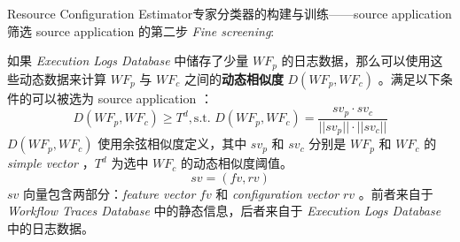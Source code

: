 \documentclass[aspectratio=169]{beamer}
\begin{document}
\begin{frame}{Resource Configuration Estimator}{专家分类器的构建与训练——source application}
  筛选 source application 的第二步 \textit{Fine screening}:

  \pause

  如果 \textit{Execution Logs Database} 中储存了少量 $WF_p$ 的日志数据，那么可以使用这些动态数据来计算 $WF_p$ 与 $WF_c$ 之间的\textbf{动态相似度} $D(WF_p,WF_c)$ 。满足以下条件的可以被选为 source application ：
  \begin{equation*}
    D(WF_p,WF_c) \geqslant T^d, \text{s.t. } D(WF_p,WF_c) = \frac{sv_p \cdot sv_c}{||sv_p|| \cdot ||sv_c||}
  \end{equation*}
  $D(WF_p,WF_c)$ 使用余弦相似度定义，其中 $sv_p$ 和 $sv_c$ 分别是 $WF_p$ 和 $WF_c$ 的 \textit{simple vector} ，$T^d$ 为选中 $WF_c$ 的动态相似度阈值。
  \begin{equation*}
    sv = (fv, rv)
  \end{equation*}
  $sv$ 向量包含两部分：\textit{feature vector} $fv$ 和 \textit{configuration vector} $rv$ 。前者来自于 \textit{Workflow Traces Database} 中的静态信息，后者来自于 \textit{Execution Logs Database} 中的日志数据。
\end{frame}
\end{document}
